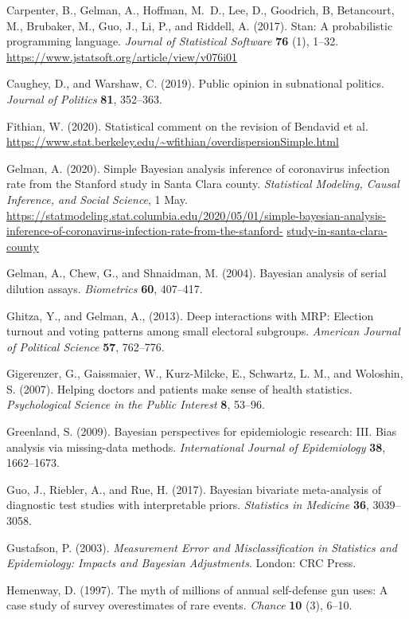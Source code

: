 \documentclass[11pt]{article}
\begin{document}
\bibitem Carpenter, B., Gelman, A., Hoffman, M.~D., Lee, D., Goodrich, B, Betancourt, M., Brubaker, M., Guo, J.,  Li, P., and Riddell, A.  (2017). Stan: A probabilistic programming language. {\em Journal of Statistical Software} {\bf 76} (1), 1--32. {\small \url{https://www.jstatsoft.org/article/view/v076i01}}

\bibitem Caughey, D., and Warshaw, C. (2019).  Public opinion in subnational politics.  {\em Journal of Politics} {\bf 81}, 352--363.

\bibitem Fithian, W. (2020).  Statistical comment on the revision of Bendavid et al. {\small \url{https://www.stat.berkeley.edu/~wfithian/overdispersionSimple.html}}

\bibitem Gelman, A. (2020).  Simple Bayesian analysis inference of coronavirus infection rate from the Stanford study in Santa Clara county. {\em Statistical Modeling, Causal Inference, and Social Science}, 1 May.  {\small \url{https://statmodeling.stat.columbia.edu/2020/05/01/simple-bayesian-analysis-inference-of-coronavirus-infection-rate-from-the-stanford-}} {\small \url{study-in-santa-clara-county}}

\bibitem Gelman, A., Chew, G., and Shnaidman, M. (2004).  Bayesian analysis of serial dilution assays. {\em Biometrics} {\bf 60}, 407--417.

\bibitem Ghitza, Y., and Gelman, A., (2013). Deep interactions with MRP: Election turnout and voting patterns among small electoral subgroups. {\em American Journal of Political Science} {\bf 57}, 762--776.

\bibitem Gigerenzer, G., Gaissmaier, W., Kurz-Milcke, E., Schwartz, L. M., and Woloshin, S.  (2007).  Helping doctors and patients make sense of health statistics.  {\em Psychological Science in the Public Interest} {\bf 8}, 53--96.

\bibitem Greenland, S. (2009).  Bayesian perspectives for epidemiologic research: III. Bias analysis via missing-data methods.  {\em International Journal of Epidemiology} {\bf 38}, 1662--1673.

\bibitem Guo, J., Riebler, A., and Rue, H. (2017).  Bayesian bivariate meta-analysis of diagnostic test studies with interpretable priors.  {\em Statistics in Medicine} {\bf 36}, 3039--3058.

\bibitem Gustafson, P. (2003).  {\em Measurement Error and Misclassification in Statistics and Epidemiology: Impacts and Bayesian Adjustments}.  London:  CRC Press.

\bibitem Hemenway, D. (1997).  The myth of millions of annual self-defense gun uses:  A case study of survey overestimates of rare events.  {\em Chance} {\bf 10} (3), 6--10.
\end{document}
